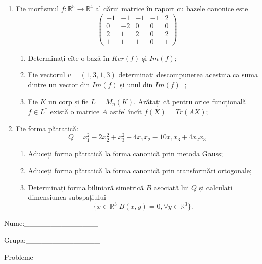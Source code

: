 \documentclass{article}
\begin{document}
\begin{enumerate}
 \item Fie morfismul $f:\mathbb{R}^5 \to \mathbb{R}^4$ al cărui matrice în raport cu bazele canonice este
$$\begin{pmatrix}
-1&-1&-1&-1&2\\
0&-2&0&0&0\\
2&1&2&0&2\\
1&1&1&0&1
\end{pmatrix}$$

\begin{enumerate}
\item Determinați cîte o bază în $Ker(f)$ și $Im(f)$;
\item Fie vectorul $v=(1,3,1,3)$ determinați descompunerea acestuia ca suma dintre un vector din $Im(f)$ și unul din $Im(f)^\perp$;
\item Fie $K$ un corp și fie $L=M_n(K)$. Arătați că pentru orice funcțională $f \in L^*$ există o matrice $A$ astfel încît $f(X)=Tr(AX)$;
\end{enumerate}
\item Fie forma pătratică:
$$Q= x_1^2-2x_2^2+x_3^2+4x_1x_2-10x_1x_3+4x_2x_3$$

\begin{enumerate}
\item Aduceți forma pătratică la forma canonică prin metoda Gauss;
\item Aduceți forma pătratică la forma canonică prin transformări ortogonale;
\item Determinați forma biliniară simetrică $B$ asociată lui $Q$ și calculați dimensiunea subspațiului
$$\{x \in \mathbb{R}^3 | B(x,y)=0,\forall y \in \mathbb{R}^3\}.$$

\end{enumerate}
\end{enumerate}
\newpage
\begin{flushright}
Nume:\_\_\_\_\_\_\_\_\_\_\_\_\_\_
 
 
Grupa:\_\_\_\_\_\_\_\_\_\_\_\_\_\_
\end{flushright}
\begin{center}
\vspace{2cm}
{\Large Probleme}
\vspace{2cm}
\end{center}
\end{document}
